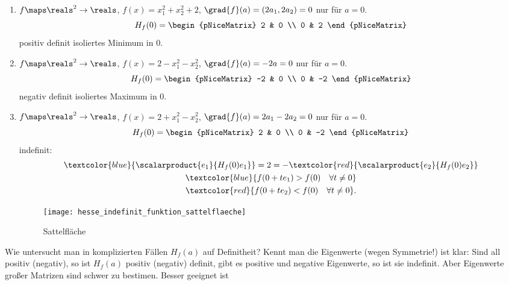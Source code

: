 \begin{beispiele*}
  \begin{enumerate}
    \item \( f\maps \reals^2\to \reals \), \( f(x)=x_1^2+x_2^2+2 \), \(\grad{f}(a)=(2a_1,2a_2)=0\) nur für \( a=0 \).
    \begin{equation*}
      H_f(0)=\begin{pNiceMatrix} 2 & 0 \\ 0 & 2 \end{pNiceMatrix}
    \end{equation*} positiv definit \timplies isoliertes Minimum in \( 0 \).  
    \item \( f\maps \reals^2\to \reals \), \( f(x)=2-x_1^2-x_2^2 \), \( \grad{f}(a)=-2a=0 \) nur für \( a=0 \). 
    \begin{equation*}
      H_f(0)=\begin{pNiceMatrix} -2 & 0 \\ 0 & -2 \end{pNiceMatrix}
    \end{equation*}
    negativ definit \timplies isoliertes Maximum in \( 0 \).
    \item \( f\maps \reals^2\to \reals \), \( f(x)=2+x_1^2-x_2^2 \), \( \grad{f}(a)=2a_1-2a_2=0 \) nur für \( a=0 \).
    \begin{equation*}
      H_f(0)=\begin{pNiceMatrix} 2 & 0 \\ 0 & -2 \end{pNiceMatrix}
    \end{equation*}
    indefinit:
    \begin{gather*}
      \textcolor{blue}{\scalarproduct{e_1}{H_f(0)e_1}}=2=-\textcolor{red}{\scalarproduct{e_2}{H_f(0)e_2}}\\
      \textcolor{blue}{f(0+te_1)>f(0)\quad \forall t\neq 0}\\
      \textcolor{red}{f(0+te_2)<f(0)\quad \forall t\neq 0}.
    \end{gather*}
    \begin{figure}[H]
      \centering
      \texttt{[image: hesse\_indefinit\_funktion\_sattelflaeche]}
      \caption*{Sattelfläche}
      \label{fig:hesse_indefinit_funktion_sattelflaeche}
    \end{figure}
  \end{enumerate}
\end{beispiele*}
\begin{bemerkung*}
  Wie untersucht man in komplizierten Fällen \( H_f(a) \) auf Definitheit? Kennt man die Eigenwerte (\texists wegen Symmetrie!) ist klar: Sind all positiv (negativ), so ist \( H_f(a) \) positiv (negativ) definit, gibt es positive und negative Eigenwerte, so ist sie indefinit. Aber Eigenwerte großer Matrizen sind schwer zu bestimen. Besser geeignet ist
\end{bemerkung*}
